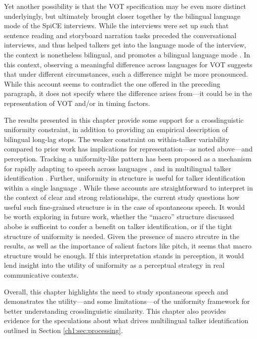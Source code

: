 Yet another possibility is that the VOT specification may be even more distinct underlyingly, but ultimately brought closer together by the bilingual language mode of the SpiCE interviews. While the interviews were set up such that sentence reading and storyboard narration tasks preceded the conversational interviews, and thus helped talkers get into the language mode of the interview, the context is nonetheless bilingual, and promotes a bilingual language mode \citep[see][]{grosjean_2011_transfer}. In this context, observing a meaningful difference across languages for VOT suggests that under different circumstances, such a difference might be more pronounced. While this account seems to contradict the one offered in the preceding paragraph, it does not specify where the difference arises from---it could be in the representation of VOT and/or in timing factors. 

The results presented in this chapter provide some support for a crosslinguistic uniformity constraint, in addition to providing an empirical description of bilingual long-lag stops. The weaker constraint on within-talker variability compared to prior work has implications for representation---as noted above---and perception. Tracking a uniformity-like pattern has been proposed as a mechanism for rapidly adapting to speech across languages \citep{reinisch_2013_retune}, and in multilingual talker identification \citep{orena_2019_identifying}. Further, uniformity in structure is useful for talker identification within a single language \citep{ganugapati_2019_structured}. While these accounts are straightforward to interpret in the context of clear and strong relationships, the current study questions how useful such fine-grained structure is in the case of spontaneous speech. It would be worth exploring in future work, whether the ``macro'' structure discussed abobe is sufficeint to confer a benefit on talker identification, or if the tight structure of uniformity is needed. Given the presence of macro strcutre in the results, as well as the importance of salient factors like pitch, it seems that macro structure would be enough. If this interpretation stands in perception, it would lend insight into the utility of uniformity as a perceptual strategy in real communicative contexts. 

Overall, this chapter highlights the need to study spontaneous speech and demonstrates the utility---and some limitations---of the uniformity framework for better understanding crosslinguistic similarity. This chapter also provides evidence for the speculations about what drives multilingual talker identification \citep{orena_2019_identifying} outlined in Section \ref{ch1:sec:processing}.


